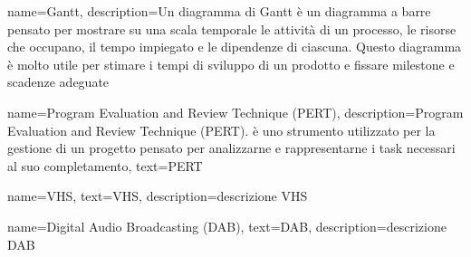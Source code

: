 {
    name={Gantt},
    description={Un diagramma di Gantt è un diagramma a barre pensato per mostrare su una scala temporale le attività di un processo, le risorse che occupano, il tempo impiegato e le dipendenze di ciascuna. Questo diagramma è molto utile per stimare i tempi di sviluppo di un prodotto e fissare milestone e scadenze adeguate}
}

{
    name={Program Evaluation and Review Technique (PERT)},
    description={Program Evaluation and Review Technique (PERT). è uno strumento utilizzato per la gestione di un progetto pensato per analizzarne e rappresentarne i task necessari al suo completamento},
    text={PERT}
}

{
    name={VHS},
    text={VHS},
    description={descrizione VHS}%
}

{
    name={Digital Audio Broadcasting (DAB)},
    text={DAB},
    description={descrizione DAB}%
}